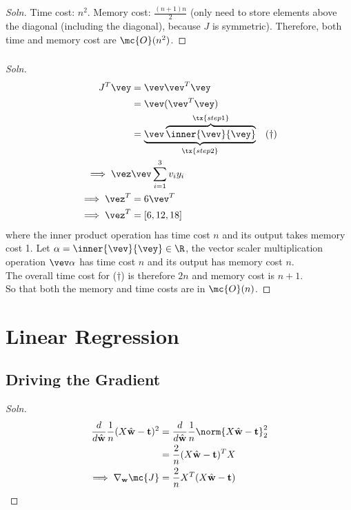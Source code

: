 \documentclass{article}
\begin{document}
	\subsubsection{}
	\begin{proof}[Soln] Time cost: $n^2$. Memory cost: $\frac{(n+1)n}{2}$ (only need to store elements above the diagonal (including the diagonal), because $J$ is symmetric). Therefore, both time and memory cost are $\mc{O}(n^2)$.
	\end{proof}
	\subsubsection{}
	\begin{proof}[Soln]
		\begin{align}
			J^T \vey &= \vev \vev^T \vey \\
			&= \vev (\vev^T \vey) \\
			&= \underbrace{\vev \overbrace{\inner{\vev}{\vey}}^{\tx{step 1}}}_{\tx{step 2}}\quad (\dagger) \\
			\implies \vez & \vev \sum_{i=1}^3 v_i y_i \\
			\implies \vez^T &= 6 \vev^T \\
			\implies \vez^T &= [6, 12, 18]
		\end{align}
		where the inner product operation has time cost $n$ and its output takes memory cost 1. Let $\alpha = \inner{\vev}{\vey} \in \R$, the vector scaler multiplication operation $\vev \alpha$ has time cost $n$ and its output has memory cost $n$. \\
		The overall time cost for ($\dagger$) is therefore $2n$ and memory cost is $n + 1$. \\
		So that both the memory and time costs are in $\mc{O}(n)$.
	\end{proof}

	\section{Linear Regression}
	\subsection{Driving the Gradient}
	\begin{proof}[Soln]
		\begin{align}
			\frac{d}{d\hat{\textbf{w}}} \frac{1}{n} (X \hat{\textbf{w}} - \textbf{t})^2
			&= \frac{d}{d\hat{\textbf{w}}} \frac{1}{n} \norm{X \hat{\textbf{w}} - \textbf{t}}^2_2 \\
			&= \frac{2}{n} (X \hat{\textbf{w}} - \textbf{t})^T X \\
		\implies \nabla_{\textbf{w}} \mc{J} &= \frac{2}{n} X^T(X\hat{\textbf{w}} - \textbf{t})
		\end{align}
	\end{proof}
\end{document}
